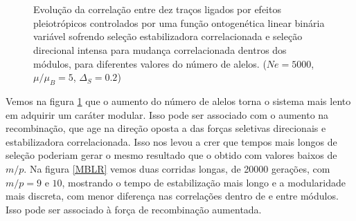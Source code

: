 \begin{center}
\begin{figure}[htbp]
  \\
  \vspace{-18pt}
  \vspace{11pt}
  \\
  \caption{Evolução da correlação entre dez traços ligados por efeitos
  pleiotrópicos controlados por uma função ontogenética linear binária
  variável sofrendo seleção estabilizadora correlacionada e seleção
  direcional intensa para mudança correlacionada dentros dos módulos,
  para diferentes valores do número de alelos. ($Ne=5000$, $\mu/\mu_B=5$, $\Delta_S=0.2$)}
  \label{MB}
\end{figure}
\end{center}

Vemos na figura \ref{MB} que o aumento do número de alelos torna o
sistema mais lento em adquirir um caráter modular. 
Isso pode ser associado com o aumento na recombinação, que age na
direção oposta a das forças seletivas direcionais e estabilizadora
correlacionada. 
Isso nos levou a crer que tempos mais longos de seleção poderiam gerar o
mesmo resultado que o obtido com valores baixos de $m/p$. 
Na figura \ref{MBLR} vemos duas corridas longas, de 20000 gerações, com
$m/p = 9$ e $10$, mostrando o tempo de estabilização mais longo e a
modularidade mais discreta, com menor diferença nas correlações dentro
de e entre módulos. 
Isso pode ser associado à força de recombinação aumentada. 

